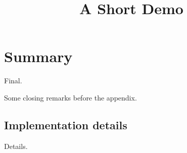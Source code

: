 \documentclass[article]{jss}
\title{A Short Demo}
\begin{document}
\section{Summary}
Final.

\noindent Some closing remarks before the appendix.
\begin{appendix}
\section{Implementation details}
Details.
\end{appendix}
\end{document}
